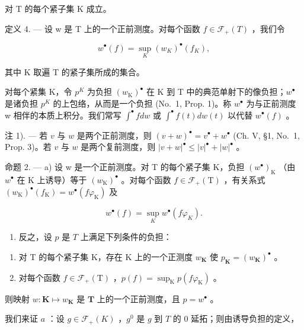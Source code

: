 对 T 的每个紧子集 K 成立。

定义 4. --- 设 w 是 T 上的一个正前测度。对每个函数 \(f \in \mathcal{F}_{+}(T)\) ，我们令

\[
w ^ {\bullet} (f) = \sup _ {K} \left(w _ {K}\right) ^ {\bullet} \left(f _ {K}\right),\tag{1}
\]

其中 K 取遍 T 的紧子集所成的集合。

对每个紧集 K，令 \(p^{K}\) 为负担 \((w_{\mathrm{K}})^{\bullet}\) 在 K 到 T 中的典范单射下的像负担；\(w^{\bullet}\) 是诸负担 \(p^{K}\) 的上包络，从而是一个负担 (No.~1, Prop. 1)。称 \(w^{\bullet}\) 为与正前测度 w 相伴的本质上积分。我们常写 \(\int^{\bullet} f dw\) 或 \(\int^{\bullet} f(t) dw(t)\) 以代替 \(w^{\bullet}(f)\) 。

注 1). --- 若 \(v\) 与 \(w\) 是两个正前测度，则 \((v + w)^{\bullet} = v^{\bullet} + w^{\bullet}\) (Ch. V, §1, No.~1, Prop. 3)。若 \(v\) 与 \(w\) 是两个复前测度，则 \(|v + w|^{\bullet} \leqslant |v|^{\bullet} + |w|^{\bullet}\) 。

命题 2. --- a) 设 w 是一个正前测度。对 T 的每个紧子集 K，负担 \((w^{\bullet})_{\mathrm{K}}\) （由 \(w^{\bullet}\) 在 K 上诱导）等于 \((w_{\mathrm{K}})^{\bullet}\) 。对每个函数 \(f \in \mathcal{F}_{+}(\mathrm{T})\) ，有关系式 \((w_{\mathrm{K}})^{\bullet}(f_{\mathrm{K}}) = w^{\bullet}(f\varphi_{\mathrm{K}})\) 及

\[
w ^ {\bullet} (f) = \sup _ {K} w ^ {\bullet} (f \varphi_ {K}).\tag{2}
\]

\begin{enumerate}
\def\labelenumi{\alph{enumi})}
\setcounter{enumi}{1}
\tightlist
\item
  反之，设 \(p\) 是 \(T\) 上满足下列条件的负担：
\end{enumerate}

\begin{enumerate}
\def\labelenumi{\arabic{enumi})}
\item
  对 T 的每个紧子集 K，存在 K 上的一个正测度 \(w_{\mathbf{K}}\) 使 \(p_{\mathbf{K}} = (w_{\mathbf{K}})^{\bullet}\) 。
\item
  对每个函数 \(f \in \mathcal{F}_{+}(\mathrm{T})\) ，\(p(f) = \sup_{\mathrm{K}} p(f\varphi_{\mathrm{K}})\) 。
\end{enumerate}

则映射 \(w: \mathbf{K} \mapsto w_{\mathbf{K}}\) 是 \(\mathbf{T}\) 上的一个正前测度，且 \(p = w^{\bullet}\) 。

我们来证 \(a\) ：设 \(g \in \mathcal{F}_{+}(K)\) ，\(g^{0}\) 是 \(g\) 到 \(T\) 的 0 延拓；则由诱导负担的定义，

